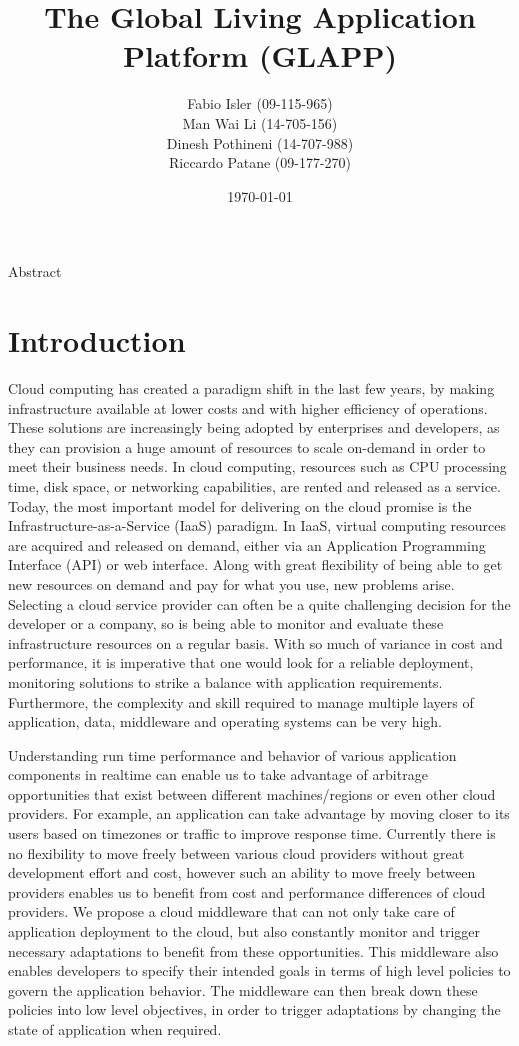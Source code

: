 \documentclass{seal_thesis}
\date{\today}
\title{The Global Living Application Platform (GLAPP)}
\subtitle{}
\author{
Fabio Isler \textmd{(09-115-965)} \\
Man Wai Li \textmd{(14-705-156)} \\
Dinesh Pothineni \textmd{(14-707-988)} \\
Riccardo Patane \textmd{(09-177-270)}}
\begin{document}
\maketitle

\abstract
Abstract


\chapter{Introduction}\label{ch:introduction}

Cloud computing has created a paradigm shift in the last few years, by making infrastructure available at lower costs and with higher efficiency of operations.
These solutions are increasingly being adopted by enterprises and developers, as they can provision a huge amount of resources to scale on-demand in order to meet their business needs.
In cloud computing, resources such as CPU processing time, disk space, or networking capabilities, are rented and released as a service.
Today, the most important model for delivering on the cloud promise is the Infrastructure-as-a-Service (IaaS) paradigm.
In IaaS, virtual computing resources are acquired and released on demand, either via an Application Programming Interface (API) or web interface.
Along with great flexibility of being able to get new resources on demand and pay for what you use, new problems arise.
Selecting a cloud service provider can often be a quite challenging decision for the developer or a company, so is being able to monitor and evaluate these infrastructure resources on a regular basis.
With so much of variance in cost and performance, it is imperative that one would look for a reliable deployment, monitoring solutions to strike a balance with application requirements.
Furthermore, the complexity and skill required to manage multiple layers of application, data, middleware and operating systems can be very high.

Understanding run time performance and behavior of various application components in realtime can enable us to take advantage of arbitrage opportunities that exist between different machines/regions or even other cloud providers.
For example, an application can take advantage by moving closer to its users based on timezones or traffic to improve response time.
Currently there is no flexibility to move freely between various cloud providers without great development effort and cost, however such an ability to move freely between providers enables us to benefit from cost and performance differences of cloud providers.
We propose a cloud middleware that can not only take care of application deployment to the cloud, but also constantly monitor and trigger necessary adaptations to benefit from these opportunities.
This middleware also enables developers to specify their intended goals in terms of high level policies to govern the application behavior.
The middleware can then break down these policies into low level objectives, in order to trigger adaptations by changing the state of application when required.
\end{document}
